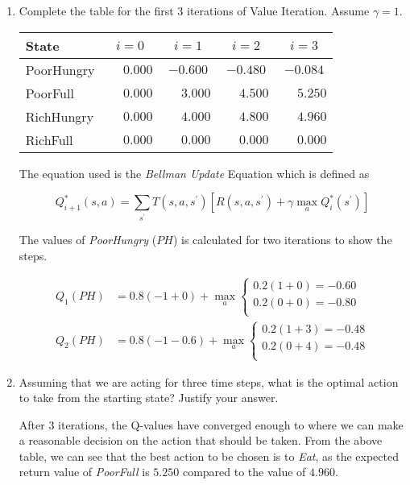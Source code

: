 \documentclass[12pt]{article}
\begin{document}
\newpage
\begin{enumerate}

\item Complete the table for the first 3 iterations of Value
  Iteration. Assume $\gamma = 1$.

\begin{center}
\begin{tabular}{|l|c|c|c|c|} \hline
State      & $i=0$ & $i=1$ & $i=2$ & $i=3$ \\ \hline \hline
PoorHungry &$\phantom{-}0.000$&$-0.600$&$-0.480$&$-0.084$\\ \hline
PoorFull   &$\phantom{-}0.000$&$\phantom{-}3.000$&$\phantom{-}4.500$&$\phantom{-}5.250$\\ \hline
RichHungry &$\phantom{-}0.000$&$\phantom{-}4.000$&$\phantom{-}4.800$&$\phantom{-}4.960$\\ \hline
RichFull   &$\phantom{-}0.000$&$\phantom{-}0.000$&$\phantom{-}0.000$&$\phantom{-}0.000$\\ \hline
\end{tabular}
\end{center}

The equation used is the {\em Bellman Update} Equation which is defined as

\[
   Q_{i+1}^{*}(s,a) = \sum_{s^{\prime}}T(s, a, s^{\prime})\left[ R(s, a, s^{\prime}) + \gamma\max_{a}Q^{*}_{i}(s^{\prime})\right]
\]

The values of {\em PoorHungry} ($PH$) is calculated for two iterations to show the steps.

\begin{align*}
Q_{1}(PH) &= 0.8(-1 + 0) + \max_{a}\left\{ \begin{array}{l} 0.2(1 + 0) = -0.60\\ 0.2(0 + 0) = -0.80\\\end{array}\right.\\
Q_{2}(PH) &= 0.8(-1 - 0.6) + \max_{a}\left\{ \begin{array}{l} 0.2(1 + 3) = -0.48\\ 0.2(0 + 4) = -0.48\\\end{array}\right.
\end{align*}

\item Assuming that we are acting for three time steps, what is the
  optimal action to take from the starting state? Justify your answer.

After 3 iterations, the Q-values have converged enough to where we can make a reasonable decision on the action that should be taken. From the above table, we can see that the best action to be chosen is to {\em Eat}, as the expected return value of {\em PoorFull} is $5.250$ compared to the value of $4.960$. 


\end{enumerate}
\end{document}
